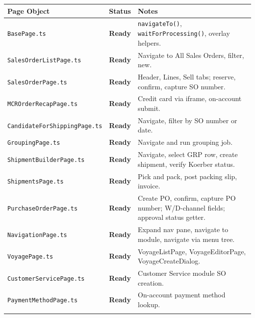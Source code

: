 \documentclass[a4paper,11pt]{article}
\begin{document}
\renewcommand{\arraystretch}{1.3}
\begin{longtable}{p{} p{} p{}}
\toprule
\textbf{Page Object} & \textbf{Status} & \textbf{Notes} \\
\midrule
\endhead
\texttt{BasePage.ts} & \textcolor{statusGreen}{\textbf{Ready}} & \texttt{navigateTo()}, \texttt{waitForProcessing()}, overlay helpers. \\\relax
\cmidrule{1-3}
\texttt{SalesOrderListPage.ts} & \textcolor{statusGreen}{\textbf{Ready}} & Navigate to All Sales Orders, filter, new. \\\relax
\cmidrule{1-3}
\texttt{SalesOrderPage.ts} & \textcolor{statusGreen}{\textbf{Ready}} & Header, Lines, Sell tabs; reserve, confirm, capture SO number. \\\relax
\cmidrule{1-3}
\texttt{MCROrderRecapPage.ts} & \textcolor{statusGreen}{\textbf{Ready}} & Credit card via iframe, on-account submit. \\\relax
\cmidrule{1-3}
\texttt{CandidateForShippingPage.ts} & \textcolor{statusGreen}{\textbf{Ready}} & Navigate, filter by SO number or date. \\\relax
\cmidrule{1-3}
\texttt{GroupingPage.ts} & \textcolor{statusGreen}{\textbf{Ready}} & Navigate and run grouping job. \\\relax
\cmidrule{1-3}
\texttt{ShipmentBuilderPage.ts} & \textcolor{statusGreen}{\textbf{Ready}} & Navigate, select GRP row, create shipment, verify Koerber status. \\\relax
\cmidrule{1-3}
\texttt{ShipmentsPage.ts} & \textcolor{statusGreen}{\textbf{Ready}} & Pick and pack, post packing slip, invoice. \\\relax
\cmidrule{1-3}
\texttt{PurchaseOrderPage.ts} & \textcolor{statusGreen}{\textbf{Ready}} & Create PO, confirm, capture PO number; W/D-channel fields; approval status getter. \\\relax
\cmidrule{1-3}
\texttt{NavigationPage.ts} & \textcolor{statusGreen}{\textbf{Ready}} & Expand nav pane, navigate to module, navigate via menu tree. \\\relax
\cmidrule{1-3}
\texttt{VoyagePage.ts} & \textcolor{statusGreen}{\textbf{Ready}} & VoyageListPage, VoyageEditorPage, VoyageCreateDialog. \\\relax
\cmidrule{1-3}
\texttt{CustomerServicePage.ts} & \textcolor{statusGreen}{\textbf{Ready}} & Customer Service module SO creation. \\\relax
\cmidrule{1-3}
\texttt{PaymentMethodPage.ts} & \textcolor{statusGreen}{\textbf{Ready}} & On-account payment method lookup. \\\relax

\end{longtable}
\end{document}
